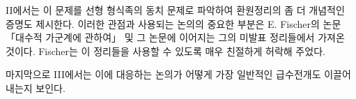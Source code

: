 
II에서는 이 문제를 선형 형식족의 동치 문제로 파악하여 환원정리의 좀 더 개념적인 증명도 제시한다. 이러한 관점과 사용되는 논의의 중요한 부분은 E. Fischer의 논문 「대수적 가군계에 관하여」 및 그 논문에 이어지는 그의 미발표 정리들에서 가져온 것이다. Fischer는 이 정리들을 사용할 수 있도록 매우 친절하게 허락해 주었다.

마지막으로 III에서는 이에 대응하는 논의가 어떻게 가장 일반적인 급수전개도 이끌어 내는지 보인다.
